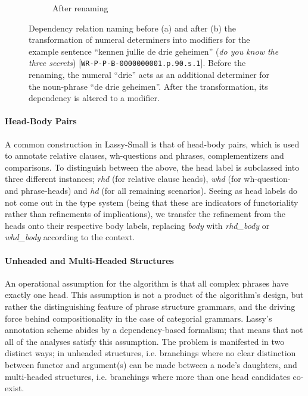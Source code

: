 \begin{figure}[t]
\begin{subfigure}{0.49\textwidth}
        \caption{After renaming}
    \end{subfigure}
    \caption[Numeral Determiner Relabeling]{Dependency relation naming before (a) and after (b) the transformation of numeral determiners into modifiers for the example sentence ``kennen jullie de drie geheimen'' (\textit{do you know the three secrets}) [\texttt{WR-P-P-B-0000000001.p.90.s.1}]. Before the renaming, the numeral ``drie'' acts as an additional determiner for the noun-phrase ``de drie geheimen''. After the transformation, its dependency is altered to a modifier.}
    \label{fig:tw_to_mod}
\end{figure}

\paragraph{Head-Body Pairs}
A common construction in Lassy-Small is that of head-body pairs, which is used to annotate relative clauses, wh-questions and phrases, complementizers and comparisons.
To distinguish between the above, the head label is subclassed into three different instances; \textit{rhd} (for relative clause heads), \textit{whd} (for wh-question- and phrase-heads) and \textit{hd} (for all remaining scenarios).
Seeing as head labels do not come out in the type system (being that these are indicators of functoriality rather than refinements of implications), we transfer the refinement from the heads onto their respective body labels, replacing \textit{body} with \textit{rhd\_body} or \textit{whd\_body} according to the context.

\paragraph{Unheaded and Multi-Headed Structures}
An operational assumption for the algorithm is that all complex phrases have exactly one head.
This assumption is not a product of the algorithm's design, but rather the distinguishing feature of phrase structure grammars, and the driving force behind compositionality in the case of categorial grammars.
Lassy's annotation scheme abides by a dependency-based formalism; that means that not all of the analyses satisfy this assumption.
The problem is manifested in two distinct ways; in unheaded structures, i.e. branchings where no clear distinction between functor and argument(s) can be made between a node's daughters, and multi-headed structures, i.e. branchings where more than one head candidates co-exist.

